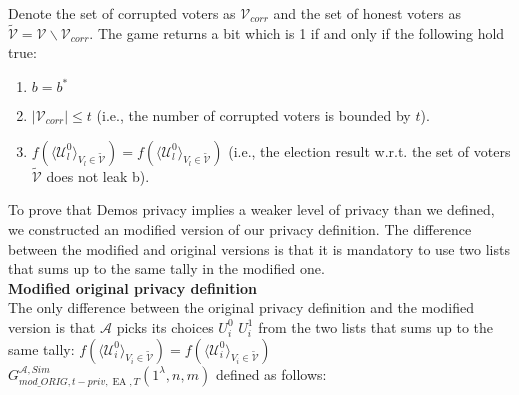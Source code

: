 \documentclass[12pt]{article}
\DeclareMathOperator{\ea}{EA}
\begin{document}
Denote the set of corrupted voters as $\mathcal{V}_{corr}$ and the set of honest voters as $\tilde{\mathcal{V}}= \mathcal{V} \backslash \mathcal{V}_{corr}$. The game returns a bit which is 1 if and only if the following hold true:
\begin{enumerate}
 \item $b = b^*$
 \item $|\mathcal{V}_{corr}| \leq t$ (i.e., the number of corrupted voters is bounded by $t$).
 \item $f(\langle \mathcal{U}^0_l \rangle _{V_l \in \tilde{\mathcal{V}}} ) = f(\langle \mathcal{U}^0_l \rangle _{V_l \in \tilde{\mathcal{V}}})$ (i.e., the election result w.r.t. the set of voters  $\tilde{\mathcal{V}}$ does not leak b).
\end{enumerate} 
To prove that Demos privacy implies a weaker level of privacy than we defined, we constructed an modified version of our privacy definition. The difference between the modified and original versions is that it is mandatory to use two lists that sums up to the same tally in the modified one.\\
 
\textbf{Modified original privacy definition}\\ 

The only difference between the original privacy definition and the modified version is that $\mathcal{A}$ picks its choices $U^0_i$ $U^1_i$ from the two lists that sums up to the same tally: $f(\langle \mathcal{U}^0_i \rangle _{V_i \in \tilde{\mathcal{V}}} ) = f(\langle \mathcal{U}^0_i \rangle _{V_i \in \tilde{\mathcal{V}}})$ \\ 

$G_{mod\_ORIG,t-priv,\ea,T}^{\mathcal{A}, Sim}(1^{\lambda},n,m)$ defined as follows:\\
\end{document}
